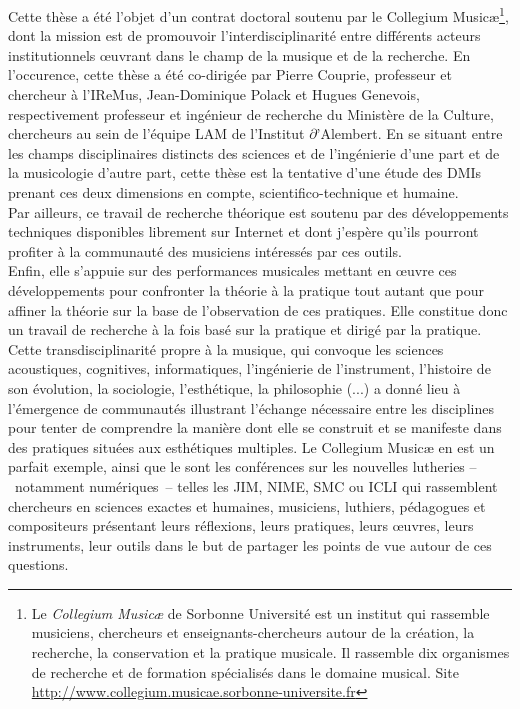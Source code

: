 \noindent Cette thèse a été l'objet d'un contrat doctoral soutenu par le Collegium Musicæ\footnote{Le \textit{Collegium Musicæ} de Sorbonne Université est un institut qui rassemble musiciens, chercheurs et enseignants-chercheurs autour de la création, la recherche, la conservation et la pratique musicale. Il rassemble dix organismes de recherche et de formation spécialisés dans le domaine musical. Site \url{http://www.collegium.musicae.sorbonne-universite.fr}}, dont la mission est de promouvoir l'interdisciplinarité entre différents acteurs institutionnels œuvrant dans le champ de la musique et de la recherche. En l'occurence, cette thèse a été co-dirigée par Pierre Couprie, professeur et chercheur à l'\gls{IReMus}, Jean-Dominique Polack et Hugues Genevois, respectivement professeur et ingénieur de recherche du Ministère de la Culture, chercheurs au sein de l'équipe \gls{LAM} de l'Institut $\partial$'Alembert. En se situant entre les champs disciplinaires distincts des sciences et de l'ingénierie d'une part et de la musicologie d'autre part, cette thèse est la tentative d'une étude des \glspl{DMI} prenant ces deux dimensions en compte, scientifico-technique et humaine.\\
\indent Par ailleurs, ce travail de recherche théorique est soutenu par des développements techniques disponibles librement sur Internet et dont j'espère qu'ils pourront profiter à la communauté des musiciens intéressés par ces outils.\\
\indent Enfin, elle s'appuie sur des performances musicales mettant en œuvre ces développements pour confronter la théorie à la pratique tout autant que pour affiner la théorie sur la base de l'observation de ces pratiques. Elle constitue donc un travail de recherche à la fois basé sur la pratique et dirigé par la pratique.\\
\indent Cette transdisciplinarité propre à la musique, qui convoque les sciences acoustiques, cognitives, informatiques, l'ingénierie de l'instrument, l'histoire de son évolution, la sociologie, l'esthétique, la philosophie (...) a donné lieu à l'émergence de communautés illustrant l'échange nécessaire entre les disciplines pour tenter de comprendre la manière dont elle se construit et se manifeste dans des pratiques situées aux esthétiques multiples. Le Collegium Musicæ en est un parfait exemple, ainsi que le sont les conférences sur les nouvelles lutheries --~notamment numériques~-- telles les \gls{JIM}, \gls{NIME}, \gls{SMC} ou \gls{ICLI} qui rassemblent chercheurs en sciences exactes et humaines, musiciens, luthiers, pédagogues et compositeurs présentant leurs réflexions, leurs pratiques, leurs œuvres, leurs instruments, leur outils dans le but de partager les points de vue autour de ces questions.


